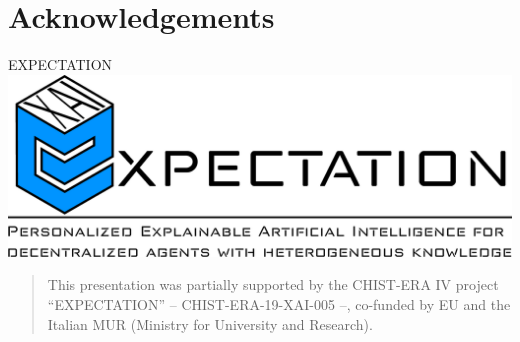 \documentclass[presentation]{beamer}\mode<presentation>{\usetheme{AMSBolognaFC}}
\begin{document}
\section*{}

\frame{\titlepage}

\section*{\refname}

\begin{frame}{\refname}
    \scriptsize
    
    
\end{frame}

\section*{Acknowledgements}

\begin{frame}{EXPECTATION}
\includegraphics[width=\linewidth]{./figures/expectation-banner.pdf}

\bigskip

\footnotesize\begin{quote}
This presentation was partially supported by the CHIST-ERA IV project ``EXPECTATION'' -- CHIST-ERA-19-XAI-005 --, co-funded by EU and the Italian MUR (Ministry for University and Research).
\end{quote}

\end{frame}


\end{document}
